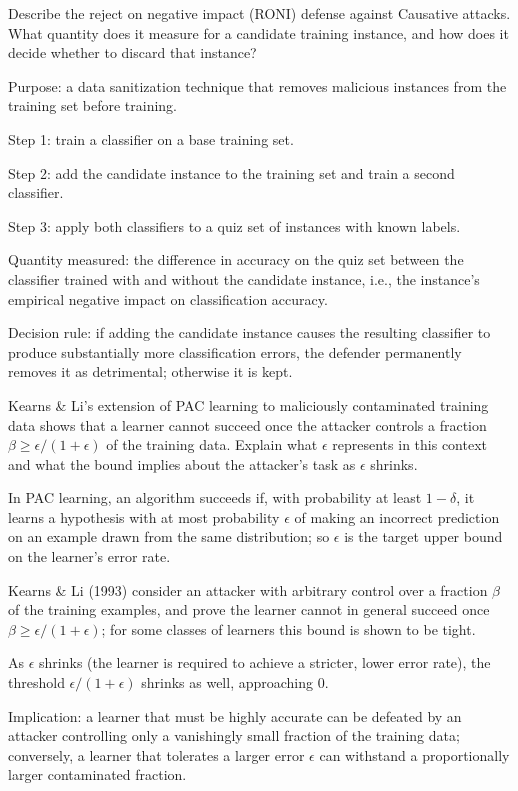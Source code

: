 \documentclass[10pt]{extarticle}
\newcommand{\resposta}[1]{\par\smallskip\noindent #1}
\begin{document}
\begin{questoes}
\item Describe the reject on negative impact (RONI) defense against Causative attacks. What quantity does it measure for a candidate training instance, and how does it decide whether to discard that instance?

\resposta{
\begin{topicos}
\item Purpose: a data sanitization technique that removes malicious instances from the training set before training.
\item Step 1: train a classifier on a base training set.
\item Step 2: add the candidate instance to the training set and train a second classifier.
\item Step 3: apply both classifiers to a quiz set of instances with known labels.
\item Quantity measured: the difference in accuracy on the quiz set between the classifier trained with and without the candidate instance, i.e., the instance's empirical negative impact on classification accuracy.
\item Decision rule: if adding the candidate instance causes the resulting classifier to produce substantially more classification errors, the defender permanently removes it as detrimental; otherwise it is kept.
\end{topicos}
}

\item Kearns \& Li's extension of PAC learning to maliciously contaminated training data shows that a learner cannot succeed once the attacker controls a fraction $\beta \geq \epsilon/(1+\epsilon)$ of the training data. Explain what $\epsilon$ represents in this context and what the bound implies about the attacker's task as $\epsilon$ shrinks.

\resposta{
\begin{topicos}
\item In PAC learning, an algorithm succeeds if, with probability at least $1-\delta$, it learns a hypothesis with at most probability $\epsilon$ of making an incorrect prediction on an example drawn from the same distribution; so $\epsilon$ is the target upper bound on the learner's error rate.
\item Kearns \& Li (1993) consider an attacker with arbitrary control over a fraction $\beta$ of the training examples, and prove the learner cannot in general succeed once $\beta \geq \epsilon/(1+\epsilon)$; for some classes of learners this bound is shown to be tight.
\item As $\epsilon$ shrinks (the learner is required to achieve a stricter, lower error rate), the threshold $\epsilon/(1+\epsilon)$ shrinks as well, approaching 0.
\item Implication: a learner that must be highly accurate can be defeated by an attacker controlling only a vanishingly small fraction of the training data; conversely, a learner that tolerates a larger error $\epsilon$ can withstand a proportionally larger contaminated fraction.
\end{topicos}
}


\end{questoes}
\end{document}
